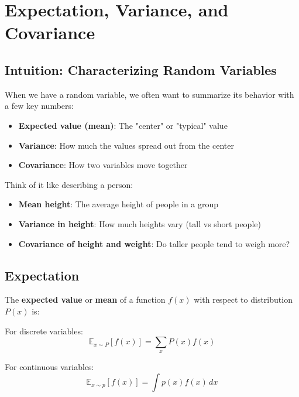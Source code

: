 
\section{Expectation, Variance, and Covariance }
\label{sec:expectation-variance}

\subsection{Intuition: Characterizing Random Variables}

When we have a random variable, we often want to summarize its behavior with a few key numbers:
\begin{itemize}
    \item \textbf{Expected value (mean)}: The "center" or "typical" value
    \item \textbf{Variance}: How much the values spread out from the center
    \item \textbf{Covariance}: How two variables move together
\end{itemize}

Think of it like describing a person:
\begin{itemize}
    \item \textbf{Mean height}: The average height of people in a group
    \item \textbf{Variance in height}: How much heights vary (tall vs short people)
    \item \textbf{Covariance of height and weight}: Do taller people tend to weigh more?
\end{itemize}

\subsection{Expectation}

The \textbf{expected value} or \textbf{mean} of a function $f(x)$ with respect to distribution $P(x)$ is:

For discrete variables:
\begin{equation}
\mathbb{E}_{x \sim P}[f(x)] = \sum_{x} P(x) f(x)
\end{equation}

For continuous variables:
\begin{equation}
\mathbb{E}_{x \sim p}[f(x)] = \int p(x) f(x) \, dx
\end{equation}

